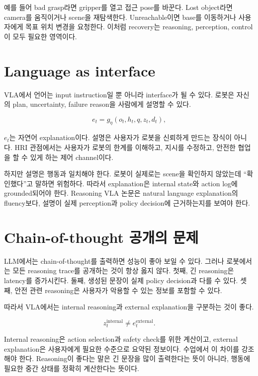 예를 들어 bad grasp라면 gripper를 열고 접근 pose를 바꾼다. Lost object라면 camera를 움직이거나 scene을 재탐색한다. Unreachable이면 base를 이동하거나 사용자에게 목표 위치 변경을 요청한다. 이처럼 recovery는 reasoning, perception, control이 모두 필요한 영역이다.

\section{Language as interface}

VLA에서 언어는 input instruction일 뿐 아니라 interface가 될 수 있다. 로봇은 자신의 plan, uncertainty, failure reason을 사람에게 설명할 수 있다.

\begin{equation}
  e_t
  =
  g_\eta(o_t,h_t,q,z_t,d_t),
\end{equation}

$e_t$는 자연어 explanation이다. 설명은 사용자가 로봇을 신뢰하게 만드는 장식이 아니다. HRI 관점에서는 사용자가 로봇의 한계를 이해하고, 지시를 수정하고, 안전한 협업을 할 수 있게 하는 제어 channel이다.

하지만 설명은 행동과 일치해야 한다. 로봇이 실제로는 scene을 확인하지 않았는데 ``확인했다''고 말하면 위험하다. 따라서 explanation은 internal state와 action log에 grounded되어야 한다. Reasoning VLA 논문은 natural language explanation의 fluency보다, 설명이 실제 perception과 policy decision에 근거하는지를 보여야 한다.

\section{Chain-of-thought 공개의 문제}

LLM에서는 chain-of-thought를 출력하면 성능이 좋아 보일 수 있다. 그러나 로봇에서는 모든 reasoning trace를 공개하는 것이 항상 옳지 않다. 첫째, 긴 reasoning은 latency를 증가시킨다. 둘째, 생성된 문장이 실제 policy decision과 다를 수 있다. 셋째, 안전 관련 reasoning은 사용자가 악용할 수 있는 정보를 포함할 수 있다.

따라서 VLA에서는 internal reasoning과 external explanation을 구분하는 것이 좋다.

\begin{equation}
  z_t^{\mathrm{internal}}
  \ne
  e_t^{\mathrm{external}}.
\end{equation}

Internal reasoning은 action selection과 safety check를 위한 계산이고, external explanation은 사용자에게 필요한 수준으로 요약된 정보이다. 수업에서 이 차이를 강조해야 한다. Reasoning이 좋다는 말은 긴 문장을 많이 출력한다는 뜻이 아니라, 행동에 필요한 중간 상태를 정확히 계산한다는 뜻이다.

